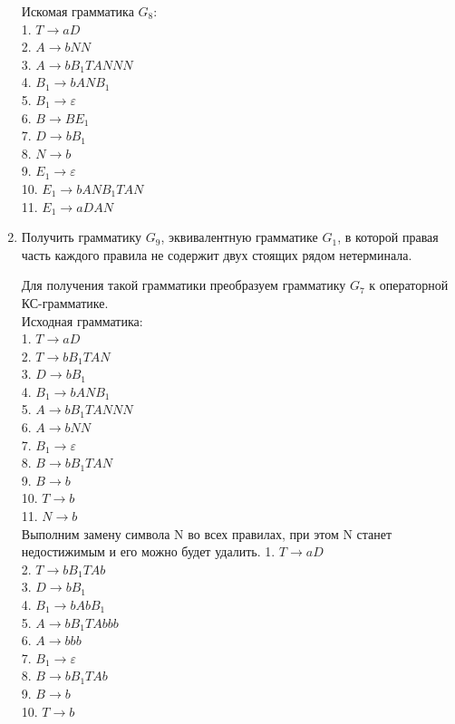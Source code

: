 \documentclass[a4paper,14pt]{extarticle}
\begin{document}
\begin{enumerate}[1.]
Искомая грамматика $G_8$:\\
1. $T \rightarrow aD$\\
2. $A \rightarrow bNN$\\
3. $A \rightarrow bB_1TANNN$\\
4. $B_1 \rightarrow bANB_1$\\
5. $B_1 \rightarrow \varepsilon$\\
6. $B \rightarrow BE_1$\\
7. $D \rightarrow bB_1$\\
8. $N \rightarrow b$\\
9. $E_1 \rightarrow \varepsilon$\\
10. $E_1 \rightarrow bANB_1TAN$\\
11. $E_1 \rightarrow aDAN$\\

\item Получить грамматику $G_9$, эквивалентную грамматике $G_1$, в которой
правая часть каждого правила не содержит двух стоящих рядом нетерминала.

Для получения такой грамматики преобразуем грамматику $G_7$ к операторной КС-грамматике.\\
Исходная грамматика:\\
1. $T \rightarrow aD$\\
2. $T \rightarrow bB_1TAN$\\
3. $D \rightarrow bB_1$\\
4. $B_1 \rightarrow bANB_1$\\
5. $A \rightarrow bB_1TANNN$\\
6. $A \rightarrow bNN$\\
7. $B_1 \rightarrow \varepsilon$\\
8. $B \rightarrow bB_1TAN$\\
9. $B \rightarrow b$\\
10. $T \rightarrow b$\\
11. $N \rightarrow b$\\

Выполним замену символа N во всех правилах, при этом N станет недостижимым и его можно будет удалить.
1. $T \rightarrow aD$\\
2. $T \rightarrow bB_1TAb$\\
3. $D \rightarrow bB_1$\\
4. $B_1 \rightarrow bAbB_1$\\
5. $A \rightarrow bB_1TAbbb$\\
6. $A \rightarrow bbb$\\
7. $B_1 \rightarrow \varepsilon$\\
8. $B \rightarrow bB_1TAb$\\
9. $B \rightarrow b$\\
10. $T \rightarrow b$\\


\end{enumerate}
\end{document}
